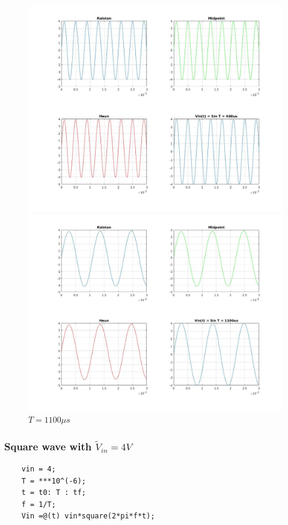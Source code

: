 \documentclass[11pt,a4paper]{article}
\begin{document}
\begin{figure}[h]
	\vspace{-5mm}
	\centering
	\includegraphics[width=\textwidth]{Ex1_Figs/sin400.jpg}
	\vspace{-15mm}
	\caption{$T = 400 \mu s$}
	\label{fig:RL4}
	\includegraphics[width=\textwidth]{Ex1_Figs/sin1100.jpg}
	\vspace{-15mm}
	\caption{$T = 1100 \mu s$}
	\label{fig:RL4}
\end{figure}



\FloatBarrier
\newpage
\subsubsection {Square wave with $\tilde{V}_{in} = 4V$}
\begin{verbatim}
    vin = 4;
    T = ***10^(-6);
    t = t0: T : tf;
    f = 1/T;
    Vin =@(t) vin*square(2*pi*f*t);
\end{verbatim}
\end{document}
